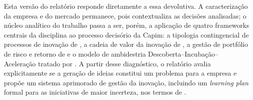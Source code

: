 Esta versão do relatório responde diretamente a essa devolutiva. A caracterização da empresa e do mercado permanece, pois contextualiza as decisões analisadas; o núcleo analítico do trabalho passa a ser, porém, a aplicação de quatro frameworks centrais da disciplina ao processo decisório da Capim: a tipologia contingencial de processos de inovação de \textcite{salerno2015}, a cadeia de valor da inovação de \textcite{hansenbirkinshaw2007}, a gestão de portfólio de risco e retorno de \textcite{goffinmitchell2010} e o modelo de ambidestria Descoberta--Incubação--Aceleração tratado por \textcite{salernogomes2018}. A partir desse diagnóstico, o relatório avalia explicitamente se a geração de ideias constitui um problema para a empresa e propõe um sistema aprimorado de gestão da inovação, incluindo um \textit{learning plan} formal para as iniciativas de maior incerteza, nos termos de \textcite{riceoconnorpierantozzi2008}.
